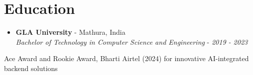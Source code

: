 \documentclass[letterpaper,10pt]{article}
\newcommand{\resumeSubheading}[4]{
  \vspace{-2pt}\item
    \textbf{#1} - #2 \\
    \textit{\small #3} - \textit{\small #4}\vspace{-7pt}
}
\newcommand{\resumeSubHeadingListStart}{\begin{itemize}[leftmargin=0.0in, label={}]}
\newcommand{\resumeSubHeadingListEnd}{\end{itemize}}
\begin{document}
\section{Education}
  \resumeSubHeadingListStart
    \resumeSubheading
      {GLA University}{Mathura, India}
      {Bachelor of Technology in Computer Science and Engineering}{2019 - 2023}
  \resumeSubHeadingListEnd
  \vspace{-2pt}
  \begin{itemize}[leftmargin=0.15in, label={}]
    \small{\item{
      Ace Award and Rookie Award, Bharti Airtel (2024) for innovative AI-integrated backend solutions
    }}
  \end{itemize}
\end{document}

